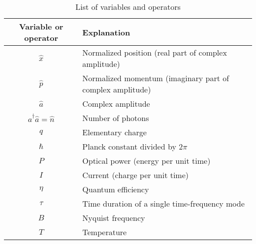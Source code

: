 \begin{table}
\caption{List of variables and operators}	
\begin{center}
\begin{tabular}{c l}
\hline
	Variable or operator & Explanation \\
	\hline \hline
	$\hat x$ & Normalized position (real part of complex amplitude)\\
	$\hat p$ & Normalized momentum (imaginary part of complex amplitude)\\
	$\hat a$ & Complex amplitude\\
	$\hat a ^\dagger \hat a = \hat n$ & Number of photons\\
	$q$ & Elementary charge\\
	$\hbar$ & Planck constant divided by $2\pi$\\
	$P$ & Optical power (energy per unit time)\\
	$I$ & Current (charge per unit time)\\
	$\eta$ & Quantum efficiency\\
	$\tau$ & Time duration of a single time-frequency mode\\
	$B$ & Nyquist frequency\\
	$T$ & Temperature\\
\hline
\end{tabular}
\label{table:variables}
\end{center}
\end{table}

